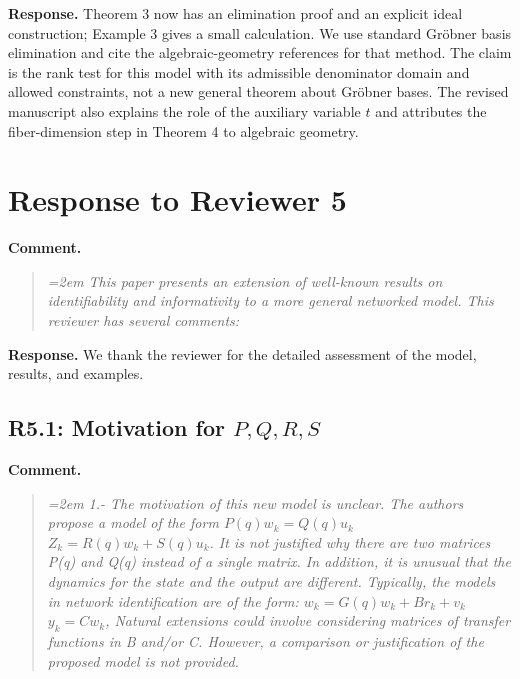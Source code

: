 \documentclass[11pt]{article}
\begin{document}
\textbf{Response.} Theorem 3 now has an elimination proof and an explicit
ideal construction; Example 3 gives a small calculation. We use
standard Gr\"obner basis elimination and cite the algebraic-geometry
references for that method. The claim is the rank test for this model
with its admissible denominator domain and allowed constraints, not a
new general theorem about Gr\"obner bases. The revised manuscript also
explains the role of the auxiliary variable $t$ and attributes the
fiber-dimension step in Theorem 4 to algebraic geometry.

\section*{Response to Reviewer 5}

\textbf{Comment.}
\begin{quote}\itshape\emergencystretch=2em
This paper presents an extension of well-known results on identifiability and informativity to a more general networked model. This reviewer has several comments:
\end{quote}

\textbf{Response.} We thank the reviewer for the detailed assessment of the model, results, and examples.

\subsection*{R5.1: Motivation for $P,Q,R,S$}
\textbf{Comment.}
\begin{quote}\itshape\emergencystretch=2em
1.- The motivation of this new model is unclear. The authors propose a model of the form $P(q)w_k=Q(q)u_k$  $Z_k=R(q)w_k+S(q)u_k$. It is not justified why there are two matrices P(q) and Q(q) instead of a single matrix. In addition, it is unusual that the dynamics for the state and the output are different. Typically, the models in network identification are of the form: $w_k=G(q)w_k+Br_k+v_k$  $y_k=Cw_k$, Natural extensions could involve considering matrices of transfer functions in B and/or C. However, a comparison or justification of the proposed model is not provided.
\end{quote}
\end{document}
